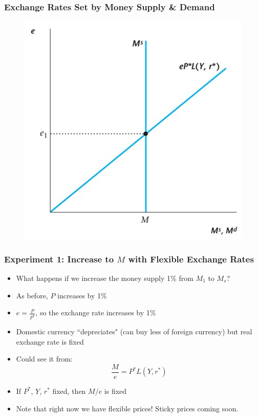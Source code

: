 \documentclass{beamer}
\begin{document}
\begin{frame}
\frametitle[alignment=center]{Exchange Rates Set by Money Supply \& Demand}
\begin{figure}
\centering
\includegraphics[scale=0.75]{Figures/W_Fig_17pt3.png}
\end{figure}
\end{frame}

\begin{frame}
\frametitle[alignment=center]{Experiment 1: Increase to $M$ with Flexible Exchange Rates}
\begin{itemize}
\item What happens if we increase the money supply 1\% from  $M_1$ to $M_s$?
\bigskip
\item As before, $P$ increases by 1\%
\bigskip
\item $e=\frac{P}{P^*}$, so the exchange rate increases by 1\%
\bigskip
\item Domestic currency ``depreciates" (can buy less of foreign currency) but real exchange rate is fixed
\bigskip
\item Could see it from:
$$\frac{M}{e}=P^*L(Y,r^*)$$
\item If $P^*$, $Y$, $r^*$ fixed, then $M/e$ is fixed
\bigskip
\item Note that right now we have flexible prices!  Sticky prices coming soon.
\end{itemize}
\end{frame}
\end{document}
